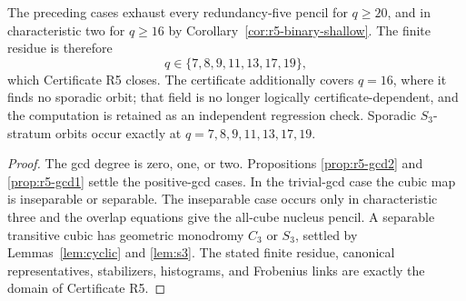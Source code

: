 \begin{proposition}\label{prop:r5-bridge}%
%
%
The preceding cases exhaust every redundancy-five pencil for
$q\geq20$, and in characteristic two for $q\geq16$ by
Corollary~\ref{cor:r5-binary-shallow}.  The finite residue is therefore
\[
       q\in\{7,8,9,11,13,17,19\},
\]
which Certificate R5 closes.  The certificate additionally covers
$q=16$, where it finds no sporadic orbit; that field is no longer
logically certificate-dependent, and the computation is retained as an
independent regression check.  Sporadic $S_3$-stratum orbits occur
exactly at $q=7,8,9,11,13,17,19$.
\end{proposition}

\begin{proof}
The gcd degree is zero, one, or two.  Propositions
\ref{prop:r5-gcd2} and \ref{prop:r5-gcd1} settle the positive-gcd
cases.  In the trivial-gcd case the cubic map is inseparable or
separable.  The inseparable case occurs only in characteristic three
and the overlap equations give the all-cube nucleus pencil.  A
separable transitive cubic has geometric monodromy $C_3$ or $S_3$,
settled by Lemmas~\ref{lem:cyclic} and \ref{lem:s3}.  The stated finite
residue, canonical representatives, stabilizers, histograms, and
Frobenius links are exactly the domain of Certificate R5.
\end{proof}

